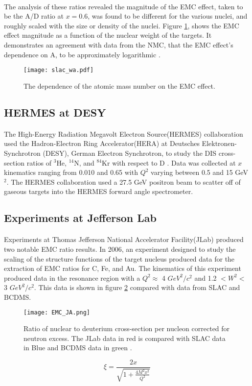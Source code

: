 \paragraph{} The analysis of these ratios revealed the magnitude of the EMC effect, taken to be the A/D ratio at $x=0.6$, was found to be different for the various nuclei, and roughly scaled with the size or density of the nuclei. Figure \ref{gomez_wa}, shows the EMC effect magnitude as a function of the nuclear weight of the targets. It demonstrates an agreement with data from the NMC, that the EMC effect's dependence on A, to be approximately logarithmic \cite{Ajth,gomez,seelyth}. 
\begin{figure}[h]
	\centering
	\caption{The dependence of the atomic mass number on the EMC effect\cite{gomez}.}
	\label{gomez_wa}
	\texttt{[image: slac\_wa.pdf]} 
\end{figure} 
\subsection{HERMES at DESY}
\paragraph{}
The High-Energy Radiation Megavolt Electron Source(HERMES) collaboration used the Hadron-Electron Ring Accelerator(HERA) at Deutsches Elektronen-Synchrotron (DESY), German Electron Synchrotron, to study the DIS cross-section ratios of $^3$He, $^{14}$N, and $^{84}$Kr with respect to D \cite{HERMES_EMC}. Data was collected at $x$ kinematics ranging from 0.010 and 0.65 with $Q^2$ varying between 0.5 and 15 GeV$^2$\cite{HERMES_EMC}. The HERMES collaboration used a 27.5 GeV positron beam to scatter off of gaseous targets into the HERMES forward angle spectrometer. 
\subsection{Experiments at Jefferson Lab}
\paragraph{}Experiments at Thomas Jefferson National Accelerator Facility(JLab) produced two notable EMC ratio results. In 2006, an experiment designed to study the scaling of the structure functions of the target nucleus produced data for the extraction of EMC ratios for C, Fe, and Au. The kinematics of this experiment produced data in the resonance region with a $Q^2 \approx$ 4 $GeV^2/c^2$ and 1.2 $ < W^2 < $ 3 $GeV^2/c^2$. This data is shown in figure \ref{fig:EMCJA} compared with data from SLAC and BCDMS. 
\begin{figure}[H]
	\centering
	\texttt{[image: EMC\_JA.png]} 
	\caption{Ratio of nuclear to deuterium cross-section per nucleon corrected for neutron excess\cite{EMC_JA}. The JLab data in red is compared with SLAC data in Blue \cite{gomez} and BCDMS data in green \cite{BCDMS}.}
	\label{fig:EMCJA}
\end{figure} 
\begin{equation}
\xi = \frac{2x}{\sqrt{1 + \frac{4M^2x^2}{Q^2}}} \label{xi}
\end{equation}

